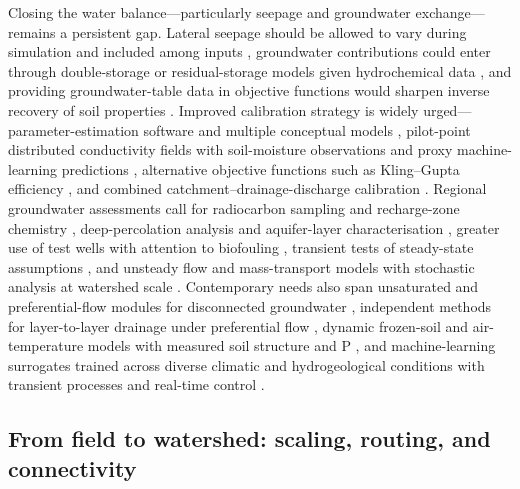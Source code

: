 \documentclass[11pt]{article}
\begin{document}
Closing the water balance---particularly seepage and groundwater exchange---
remains a persistent gap. Lateral seepage should be allowed to vary during
simulation and included among inputs \parencite{Feng2018}, groundwater
contributions could enter through double-storage or residual-storage models
given hydrochemical data \parencite{DaneshYazdi2016}, and providing
groundwater-table data in objective functions would sharpen inverse recovery of
soil properties \parencite{Sedaghatdoost2018,Sedaghatdoost2019}. Improved
calibration strategy is widely urged---parameter-estimation software and
multiple conceptual models \parencite{Boico2022}, pilot-point distributed
conductivity fields with soil-moisture observations and proxy machine-learning
predictions \parencite{Schneider2022}, alternative objective functions such as
Kling--Gupta efficiency \parencite{Brighenti2023}, and combined
catchment--drainage-discharge calibration \parencite{DeSchepper2017}. Regional
groundwater assessments call for radiocarbon sampling and recharge-zone chemistry
\parencite{Tweed2018,Dragon2016}, deep-percolation analysis and aquifer-layer
characterisation \parencite{BOOKMAN1959,KAMRA1991,KAMRA1994}, greater use of
test wells with attention to biofouling \parencite{Stuetz2004}, transient tests
of steady-state assumptions \parencite{Schilling2022}, and unsteady flow and
mass-transport models with stochastic analysis at watershed scale
\parencite{Gates2002,Burkhalter2006}. Contemporary needs also span unsaturated
and preferential-flow modules for disconnected groundwater
\parencite{Kompanizare2024}, independent methods for layer-to-layer drainage
under preferential flow \parencite{Ojeda2018}, dynamic frozen-soil and
air-temperature models with measured soil structure and P \parencite{Ulén2016},
and machine-learning surrogates trained across diverse climatic and
hydrogeological conditions with transient processes and real-time control
\parencite{Lei2026}.

\subsection{From field to watershed: scaling, routing, and connectivity}
\end{document}
